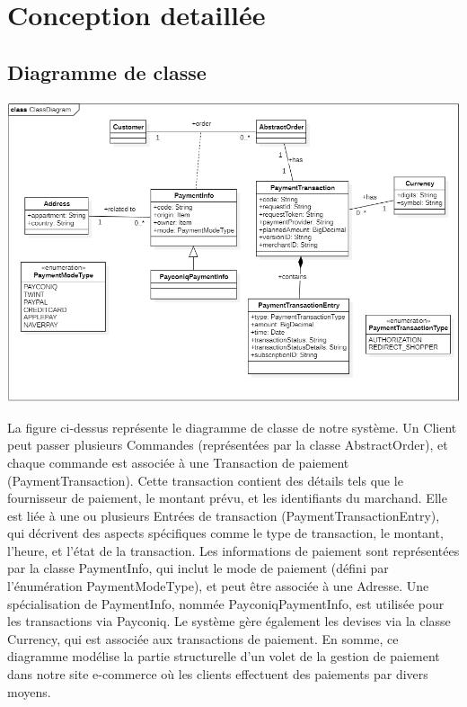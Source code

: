 \section{Conception detaillée}

\subsection{Diagramme de classe}
\begin{center}
    \centering
    \includegraphics[width=19cm]{Figures/class.png}
\end{center}

La figure ci-dessus représente le diagramme de classe de notre système. Un Client peut passer plusieurs Commandes (représentées par la classe AbstractOrder), et chaque commande est associée à une Transaction de paiement (PaymentTransaction). Cette transaction contient des détails tels que le fournisseur de paiement, le montant prévu, et les identifiants du marchand. Elle est liée à une ou plusieurs Entrées de transaction (PaymentTransactionEntry), qui décrivent des aspects spécifiques comme le type de transaction, le montant, l'heure, et l'état de la transaction. Les informations de paiement sont représentées par la classe PaymentInfo, qui inclut le mode de paiement (défini par l'énumération PaymentModeType), et peut être associée à une Adresse. Une spécialisation de PaymentInfo, nommée PayconiqPaymentInfo, est utilisée pour les transactions via Payconiq. Le système gère également les devises via la classe Currency, qui est associée aux transactions de paiement. En somme, ce diagramme modélise la partie structurelle d'un volet de la gestion de paiement dans notre site e-commerce où les clients effectuent des paiements par divers moyens.

